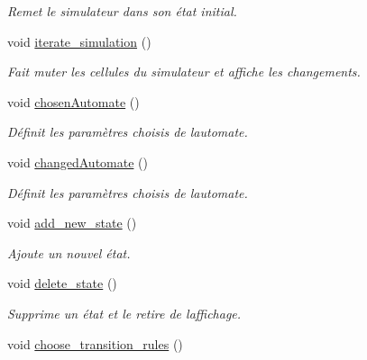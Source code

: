 \begin{DoxyCompactItemize}
\begin{DoxyCompactList}\small\item\em Remet le simulateur dans son état initial. \end{DoxyCompactList}\item 
\mbox{\label{class_simulator_interface_a93e75685e9429c4a60d9f66932c7d94f}} 
void \mbox{\hyperlink{class_simulator_interface_a93e75685e9429c4a60d9f66932c7d94f}{iterate\+\_\+simulation}} ()
\begin{DoxyCompactList}\small\item\em Fait muter les cellules du simulateur et affiche les changements. \end{DoxyCompactList}\item 
void \mbox{\hyperlink{class_simulator_interface_a6df53df15af33dadb613953e6f9771b6}{chosen\+Automate}} ()
\begin{DoxyCompactList}\small\item\em Définit les paramètres choisis de l\textquotesingle{}automate. \end{DoxyCompactList}\item 
void \mbox{\hyperlink{class_simulator_interface_adfd1e916c7058a3c6fb1115af26236c3}{changed\+Automate}} ()
\begin{DoxyCompactList}\small\item\em Définit les paramètres choisis de l\textquotesingle{}automate. \end{DoxyCompactList}\item 
void \mbox{\hyperlink{class_simulator_interface_a64e59139c9e67758d9c2c0f2a2029749}{add\+\_\+new\+\_\+state}} ()
\begin{DoxyCompactList}\small\item\em Ajoute un nouvel état. \end{DoxyCompactList}\item 
\mbox{\label{class_simulator_interface_abfc00339369fd60f3e9d3163df2921ee}} 
void \mbox{\hyperlink{class_simulator_interface_abfc00339369fd60f3e9d3163df2921ee}{delete\+\_\+state}} ()
\begin{DoxyCompactList}\small\item\em Supprime un état et le retire de l\textquotesingle{}affichage. \end{DoxyCompactList}\item 
void \mbox{\hyperlink{class_simulator_interface_a646f9fb84f5ec7e7cb4115b12f4a03bf}{choose\+\_\+transition\+\_\+rules}} ()

\end{DoxyCompactItemize}
